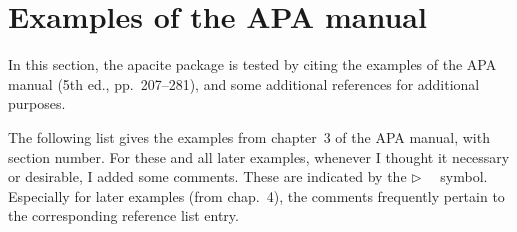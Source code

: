 \documentclass{article}
\newcommand{\EM}{\ensuremath{\triangleright\quad}}
\newcommand{\pkg}[1]{\textsf{#1}}%
\begin{document}
\section{Examples of the APA manual}
\label{sec:xmpl}
In this section, the \pkg{apacite} package is tested by citing the examples of
the APA manual (5th ed., pp.~207--281), and some additional references for
additional purposes.

The following list gives the examples from chapter~3 of the APA manual, with
section number. For these and all later examples, whenever I thought it
necessary or desirable, I added some comments. These are indicated by the \EM{}
symbol. Especially for later examples (from chap.~4), the comments frequently
pertain to the corresponding reference list entry.
\end{document}
